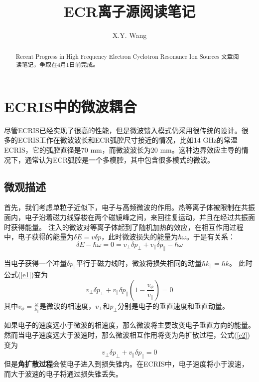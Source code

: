 \documentclass{article}
\title{ECR离子源阅读笔记}
\author{X.Y. Wang}
\begin{document}
\maketitle

\begin{abstract}
Recent Progress in High Frequency Electron Cyclotron Resonance Ion Sources 文章阅读笔记，争取在4月1日前完成。
\end{abstract}

\section{ECRIS中的微波耦合}
尽管ECRIS已经实现了很高的性能，但是微波馈入模式仍采用很传统的设计。很多的ECRIS工作在微波波长和ECR弧腔尺寸接近的情况，比如14 GHz的常温ECRIS，它的弧腔直径是70 mm，而微波波长为20 mm。这种边界效应主导的情况下，通常认为ECR弧腔是一个多模腔，其中包含很多模式的微波。

\subsection{微观描述}
首先，我们考虑单粒子近似下，电子与高频微波的作用。热等离子体被限制在共振面内，电子沿着磁力线穿梭在两个磁镜峰之间，来回往复运动，并且在经过共振面时获得能量。
注入的微波对等离子体起到了随机加热的效应，在相互作用过程中，电子获得的能量为$\delta E = v \delta p$，此时微波损失的能量为$\hbar \omega$。于是有关系：
\begin{equation}
\delta E-\hbar\omega=0=v_\perp \delta p_\perp +v_\parallel \delta p_\parallel-\hbar\omega
\label{e1}
\end{equation}

当电子获得一个冲量$\delta p_\parallel$平行于磁力线时，微波将损失相同的动量$\hbar k_\parallel=\hbar k$。
此时公式(\ref{e1})变为
\begin{equation}
v_\perp \delta p_\perp +v_\parallel \delta p_\parallel(1-\frac{v_\phi}{v_\parallel})=0
\label{e2}
\end{equation}
其中$v_\phi=\frac{\omega}{k_\parallel}$是微波的相速度，$v_\perp$和$p_\perp$分别是电子的垂直速度和垂直动量。

如果电子的速度远小于微波的相速度，那么微波将主要改变电子垂直方向的能量。然而当电子速度远大于波速时，那么微波相互作用将变为角扩散过程，公式(\ref{e2})变为
\begin{equation}
v_\perp \delta p_\perp +v_\parallel \delta p_\parallel=0
\label{e3}
\end{equation}
但是\textbf{角扩散过程}会使电子进入到损失锥内。在ECRIS中，电子速度将小于波速，而大于波速的电子将通过损失锥丢失。
\end{document}
